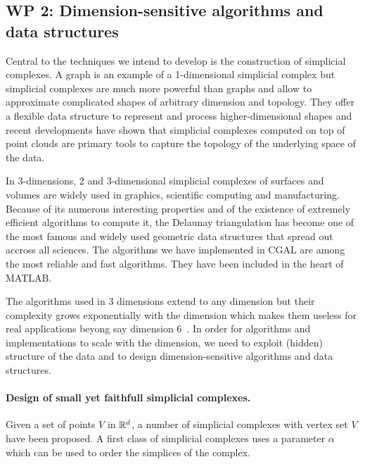 \subsection*{WP 2:  Dimension-sensitive algorithms and data structures} 

Central to the techniques we intend to develop is the construction of simplicial complexes.  A graph is an example of a 1-dimensional simplicial complex but simplicial complexes are much more powerful than graphs and allow to approximate complicated shapes of arbitrary dimension and topology. They offer a flexible data structure to represent and process higher-dimensional shapes and recent developments have shown that simplicial complexes computed on top of point clouds are primary tools to capture the topology of the underlying space of the data. 

In 3-dimensions, 2 and 3-dimensional simplicial complexes of surfaces and volumes are widely used in graphics, scientific computing and manufacturing. Because of its numerous interesting properties and of the existence of extremely efficient algorithms to compute it, the Delaunay triangulation has become one of the most famous and widely used geometric data structures that spread out accross all sciences. The algorithms we have implemented in CGAL are among the most reliable and fast algorithms. They have been included in the heart of MATLAB. 

The algorithms used in 3 dimensions extend to any dimension but their complexity grows exponentially with the dimension which makes them useless for real applications beyong say dimension 6~\cite{avis,hornus}.  In order for algorithms and implementations to scale with the dimension, we need to exploit (hidden) structure of the data and to design dimension-sensitive algorithms and data structures.


\paragraph{Design of small yet faithfull simplicial complexes.} 
Given a set of points $V$ in $\mathbb R ^d$, a number of simplicial complexes
with vertex set $V$ have been proposed. A first class of simplicial
complexes uses a parameter $\alpha$ which can be used to order the
simplices of the complex.

